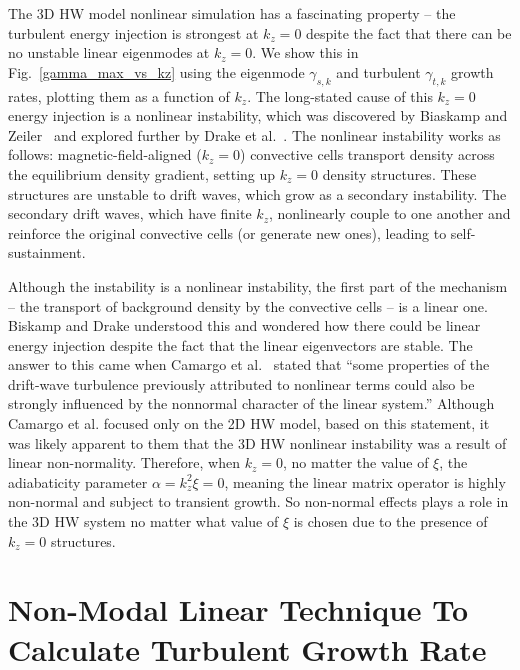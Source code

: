 \documentclass[letter,scriptaddress,twocolumn, prl,showkeys]{revtex4}
\begin{document}
The 3D HW model nonlinear simulation has a fascinating property -- the turbulent energy injection is strongest at $k_z = 0$ despite the fact that there can be no unstable linear eigenmodes at $k_z=0$.
We show this in Fig.~\ref{gamma_max_vs_kz} using the eigenmode $\gamma_{s,k}$ and turbulent $\gamma_{t,k}$ growth rates, plotting them as a function of $k_z$.
The long-stated cause of this $k_z=0$ energy injection is a nonlinear instability, which was discovered by Biaskamp and Zeiler~\cite{biskamp1995} and explored further by Drake et al.~\cite{drake1995}. 
The nonlinear instability works as follows: magnetic-field-aligned ($k_z=0$) convective cells transport density across the equilibrium density gradient, setting up $k_z=0$ density structures. 
These structures are unstable to drift waves, which grow as a secondary instability.
The secondary drift waves, which have finite $k_z$, nonlinearly couple to one another and reinforce the original convective cells (or generate new ones), leading to self-sustainment.

Although the instability is a nonlinear instability, the first part of the mechanism -- the transport of background density by the convective cells -- is a linear one.
Biskamp and Drake understood this and wondered how there could be linear energy injection despite the fact that the linear eigenvectors are stable.
The answer to this came when Camargo et al.~\cite{camargo1998} stated that ``some properties of the drift-wave turbulence
previously attributed to nonlinear terms could also be strongly influenced by the nonnormal character of the linear system.'' Although Camargo et al. focused only on the 2D HW model,
based on this statement, it was likely apparent to them that the 3D HW nonlinear instability was a result of linear non-normality. 
Therefore, when $k_z=0$, no matter the value of $\xi$, the adiabaticity parameter $\alpha = k_z^2 \xi = 0$, meaning the linear matrix operator is highly non-normal and subject to transient growth.
So non-normal effects plays a role in the 3D HW system no matter what value of $\xi$ is chosen due to the presence of $k_z=0$ structures.

\section{Non-Modal Linear Technique To Calculate Turbulent Growth Rate}
\end{document}
